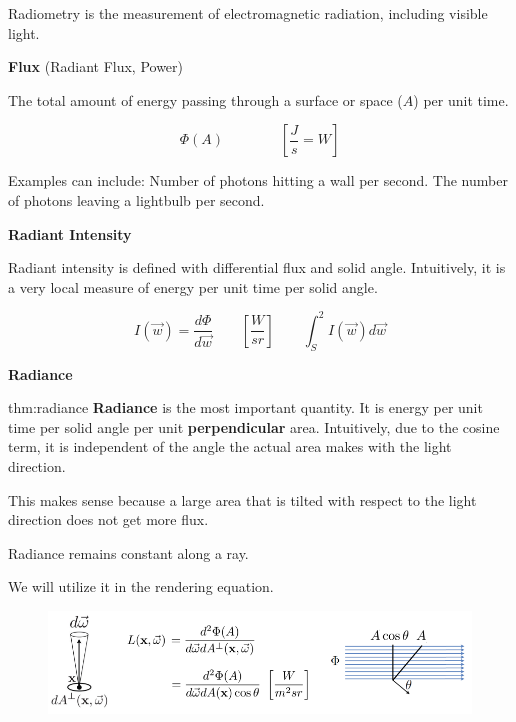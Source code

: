 \documentclass{article}
\begin{document}
Radiometry is the measurement of electromagnetic radiation, including visible light.

\textbf{Flux} (Radiant Flux, Power)

The total amount of energy passing through a surface or space (\(A\)) per unit time.

\[
    \varPhi(A) \qquad \qquad \left[\frac{J}{s} = W\right]
\]

Examples can include: Number of photons hitting a wall per second. The number of photons leaving a 
lightbulb per second.

\vspace{10px}

\textbf{Radiant Intensity}

\vspace{5px}

Radiant intensity is defined with differential flux and solid angle. Intuitively, it is a very local 
measure of energy per unit time per solid angle.

\[
    I(\vec{w}) = \frac{d\varPhi}{d \vec{w}} \qquad \left[\frac{W}{sr}\right] \qquad
     \int_S^2 I(\vec{w}) d \vec{w}
\]


\newpage

\textbf{Radiance}

\begin{defin}[Radiance]{thm:radiance}
    \textbf{Radiance} is the most important quantity. It is energy per unit time per solid angle per unit 
    \textbf{perpendicular} area. Intuitively, due to the cosine term, it is independent of the angle the actual 
    area makes with the light direction.

    \vspace{5px}

    This makes sense because a large area that is tilted with respect to the light direction does not get 
    more flux.

    \vspace{5px}

    Radiance remains constant along a ray. 

    \vspace{5px}

    We will utilize it in the rendering equation.
\end{defin}

\begin{figure}[!ht]
    \centering
    \includegraphics[width=0.8\linewidth]{images/radiant_intensity_per_perp_area.png}
\end{figure}
\end{document}
